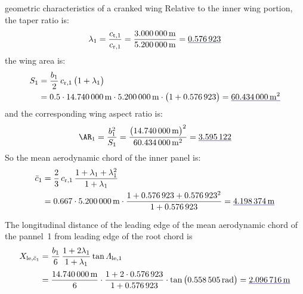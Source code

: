 \documentclass[[12pt,twoside]{book}
\begin{document}
\begin{myExampleX}{geometric characteristics of a cranked wing}{}
Relative to the inner wing portion, the taper ratio is:
\[
\lambda_1
  =\frac{c_{\mathrm{t},1}}{c_{\mathrm{r},1}}
  =\frac{\SI[round-precision=2]{\myChordTipWingIMT}{\metre}}{\SI[round-precision=2]{\myChordRootWingIMT}{\metre}}
  =\mathunderline{mydarkblue}{ \SI[round-precision=2]{\myTaperRatioWingI}{} }
\]
the wing area is:
\[
\begin{split}
S_1 & {}= \frac{b_1}{2} \, c_{\mathrm{r},1} \, \big( 1 + \lambda_1 \big) \\
  & {}=
    \num{0.5} \cdot \SI[round-precision=1]{\mySpanWingIMT}{\metre}
      \cdot \SI[round-precision=2]{\myChordRootWingIMT}{\metre}
      \cdot \big( 1 + \SI[round-precision=2]{\myTaperRatioWingI}{} \big) 
    = \mathunderline{mydarkblue}{ \SI[round-precision=1]{\myAreaWingIMTsquared}{\metre^2} }
\end{split}
\]
and the corresponding wing aspect ratio is:
\[
\AR_1 
  = \frac{b_1^2}{S_1}
  = \frac{\big(\SI[round-precision=1]{\mySpanWingIMT}{\metre}\big)^2}{\SI[round-precision=1]{\myAreaWingIMTsquared}{\metre^2}}
  = \mathunderline{mydarkblue}{ \num[round-precision=2]{\myAspectRatioWingI} }
\]
%
So the mean aerodynamic chord of the inner panel is:
\[
\begin{split}
\bar{c}_1 & {}= \frac{2}{3} \, c_{\mathrm{r},1} \, \frac{1+\lambda_1 + \lambda_1^2}{1+\lambda_1} \\
  & {}=
    \num{0.667} \cdot \SI[round-precision=2]{\myChordRootWingIMT}{\metre}
      \cdot 
        \frac{
          1 + \SI[round-precision=2]{\myTaperRatioWingI}{} + \SI[round-precision=2]{\myTaperRatioWingI}{}^2
        }{
          1 + \SI[round-precision=2]{\myTaperRatioWingI}{}
        }
    = \mathunderline{mydarkblue}{ \SI[round-precision=2]{\myMACWingIMT}{\metre} }
\end{split}
\]

The longitudinal distance of the leading edge of the mean aerodynamic chord of the pannel~1 from
leading edge of the root chord is
\[
\begin{split}
X_{\mathrm{le},\bar{c}_1} 
  & {}=
    \frac{b_1}{6} \, \frac{1+2\lambda_1}{1+\lambda_1} \tan\Lambda_\mathrm{le,1} \\[3pt]
  & {}=
    \frac{\SI[round-precision=1]{\mySpanWingIMT}{\metre}}{6}
      \cdot 
      \frac{
        1 + 2\cdot\SI[round-precision=2]{\myTaperRatioWingI}{}
      }{
        1 + \SI[round-precision=2]{\myTaperRatioWingI}{}
      }
      \cdot \tan \big( \SI[round-precision=3]{\mySweepLEWingIRAD}{\radian} \big)
    = \mathunderline{mydarkblue}{ \SI[round-precision=2]{\myXMACLEToApexWingIMT}{\metre} }
\end{split}
\]


\end{myExampleX}
\end{document}
